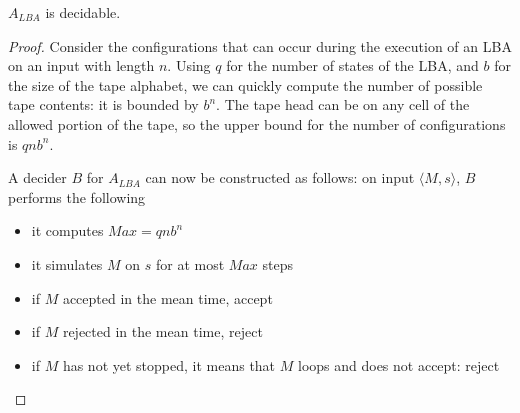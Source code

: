 \begin{theorem}
$A_{LBA}$ is decidable.
\end{theorem}
\begin{proof}
Consider the configurations that can occur during the execution of
an LBA on an input with length $n$. Using $q$ for the number of states
of the LBA, and $b$ for the size of the tape alphabet, we can quickly
compute the number of possible tape contents: it is bounded by
$b^n$. The tape head can be on any cell of the allowed portion of the
tape, so the upper bound for the number of configurations is $qnb^n$.

A decider $B$ for $A_{LBA}$ can now be constructed as follows:
on input $\langle M,s \rangle$, $B$ performs the following
\begin{itemize}
\item it computes $Max = qnb^n$
\item it simulates $M$ on $s$ for at most $Max$ steps
\item if $M$ accepted in the mean time, accept
\item if $M$ rejected in the mean time, reject
\item if $M$ has not yet stopped, it means that $M$ loops and does not
  accept: reject\vspace{-1.5em}
\end{itemize}
\end{proof}


